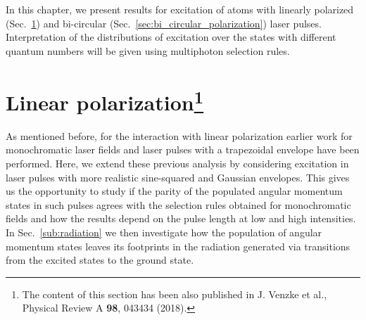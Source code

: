 In this chapter, we present results for excitation of atoms with linearly polarized (Sec.~\ref{sec:linear_polarization}) and bi-circular (Sec.~\ref{sec:bi_circular_polarization}) laser pulses. Interpretation of the distributions of excitation over the states with different quantum numbers will be given using multiphoton selection rules. 



\section[Linear polarization]{Linear polarization\protect\footnote{The content of this section has been also published in J. Venzke et al., Physical Review A \textbf{98}, 043434 (2018).}} %
\label{sec:linear_polarization}

As mentioned before, for the interaction with linear polarization earlier work for monochromatic laser fields \cite{krajewska2012} and laser pulses with a trapezoidal envelope \cite{piraux2017} have been performed. Here, we extend these previous analysis by considering excitation in laser pulses with more realistic sine-squared and Gaussian envelopes. This gives us the opportunity to study if the parity of the populated angular momentum states in such pulses agrees with the selection rules obtained for monochromatic fields and how the results depend on the pulse length at low and high intensities. In Sec.~\ref{sub:radiation} we then investigate how the population of angular momentum states leaves its footprints in the radiation generated via transitions from the excited states to the ground state. 

